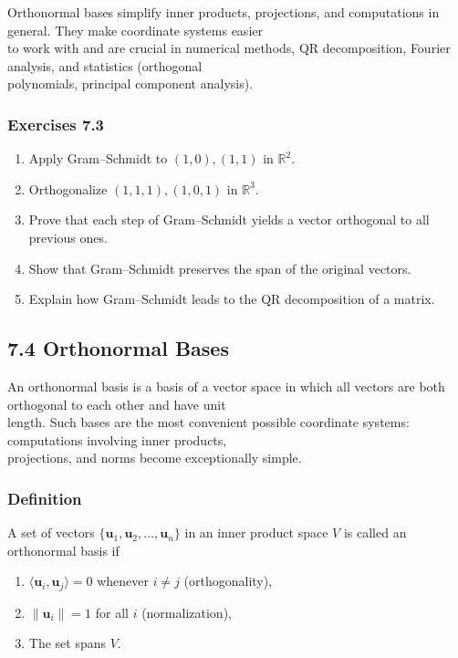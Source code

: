 \documentclass[
  12pt,
  a4paper,
]{article}
\begin{document}
Orthonormal bases simplify inner products, projections, and computations
in general. They make coordinate systems easier\\
to work with and are crucial in numerical methods, QR decomposition,
Fourier analysis, and statistics (orthogonal\\
polynomials, principal component analysis).

\subsubsection{Exercises 7.3}\label{exercises-73}

\begin{enumerate}
\def\labelenumi{\arabic{enumi}.}
\item
  Apply Gram--Schmidt to \((1,0), (1,1)\) in \(\mathbb{R}^2\).
\item
  Orthogonalize \((1,1,1), (1,0,1)\) in \(\mathbb{R}^3\).
\item
  Prove that each step of Gram--Schmidt yields a vector orthogonal to
  all previous ones.
\item
  Show that Gram--Schmidt preserves the span of the original vectors.
\item
  Explain how Gram--Schmidt leads to the QR decomposition of a matrix.
\end{enumerate}

\subsection{7.4 Orthonormal Bases}\label{74-orthonormal-bases}

An orthonormal basis is a basis of a vector space in which all vectors
are both orthogonal to each other and have unit\\
length. Such bases are the most convenient possible coordinate systems:
computations involving inner products,\\
projections, and norms become exceptionally simple.

\subsubsection{Definition}\label{definition-4}

A set of vectors \(\{\mathbf{u}_1, \mathbf{u}_2, \dots, \mathbf{u}_n\}\)
in an inner product space \(V\) is called an\\
orthonormal basis if

\begin{enumerate}
\def\labelenumi{\arabic{enumi}.}
\item
  \(\langle \mathbf{u}_i, \mathbf{u}_j \rangle = 0\) whenever
  \(i \neq j\) (orthogonality),
\item
  \(\|\mathbf{u}_i\| = 1\) for all \(i\) (normalization),
\item
  The set spans \(V\).
\end{enumerate}
\end{document}
